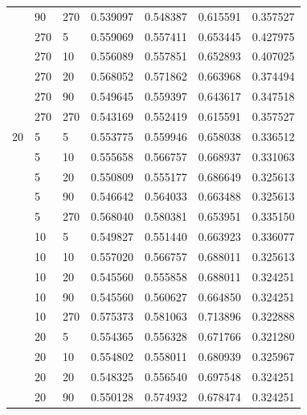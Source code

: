 \documentclass[pageno]{jpaper}
\begin{document}
\begin{longtable}{p{2cm} p{2cm} p{2cm} p{2cm} p{2cm} p{2cm} p{2cm}}
& 90 & 270 & 0.539097 & 0.548387 & 0.615591 & 0.357527 \\

& 270 & 5 & 0.559069 & 0.557411 & 0.653445 & 0.427975 \\

& 270 & 10 & 0.556089 & 0.557851 & 0.652893 & 0.407025 \\

& 270 & 20 & 0.568052 & 0.571862 & 0.663968 & 0.374494 \\

& 270 & 90 & 0.549645 & 0.559397 & 0.643617 & 0.347518 \\

& 270 & 270 & 0.543169 & 0.552419 & 0.615591 & 0.357527 \\
\hline
20 & 5 & 5 & 0.553775 & 0.559946 & 0.658038 & 0.336512 \\

& 5 & 10 & 0.555658 & 0.566757 & 0.668937 & 0.331063 \\

& 5 & 20 & 0.550809 & 0.555177 & 0.686649 & 0.325613 \\

& 5 & 90 & 0.546642 & 0.564033 & 0.663488 & 0.325613 \\

& 5 & 270 & 0.568040 & 0.580381 & 0.653951 & 0.335150 \\

& 10 & 5 & 0.549827 & 0.551440 & 0.663923 & 0.336077 \\

& 10 & 10 & 0.557020 & 0.566757 & 0.688011 & 0.325613 \\

& 10 & 20 & 0.545560 & 0.555858 & 0.688011 & 0.324251 \\

& 10 & 90 & 0.545560 & 0.560627 & 0.664850 & 0.324251 \\

& 10 & 270 & 0.575373 & 0.581063 & 0.713896 & 0.322888 \\

& 20 & 5 & 0.554365 & 0.556328 & 0.671766 & 0.321280 \\

& 20 & 10 & 0.554802 & 0.558011 & 0.680939 & 0.325967 \\

& 20 & 20 & 0.548325 & 0.556540 & 0.697548 & 0.324251 \\

& 20 & 90 & 0.550128 & 0.574932 & 0.678474 & 0.324251 \\


\end{longtable}
\end{document}
